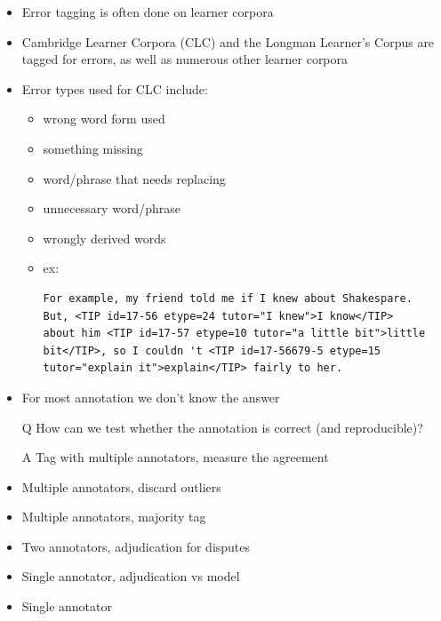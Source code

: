\documentclass[a4paper,landscape,headrule,footrule,dvips]{foils}
\begin{document}
\begin{CJK}{UTF8}{min}
\begin{itemize}
\item  Error tagging is often done on learner corpora
\item  Cambridge Learner Corpora (CLC) and the Longman Learner’s Corpus
are tagged for errors, as well as numerous other learner corpora
\item  Error types used for CLC include:
  \begin{itemize}
  \item  wrong word form used
  \item  something missing
  \item  word/phrase that needs replacing
  \item  unnecessary word/phrase
  \item  wrongly derived words
  \item  ex: 
    \begin{small}
\begin{verbatim}
For example, my friend told me if I knew about Shakespare. 
But, <TIP id=17-56 etype=24 tutor="I knew">I know</TIP> 
about him <TIP id=17-57 etype=10 tutor="a little bit">little 
bit</TIP>, so I couldn 't <TIP id=17-56679-5 etype=15 
tutor="explain it">explain</TIP> fairly to her.
\end{verbatim}
    \end{small}

  \end{itemize}
\end{itemize}



\begin{itemize}
\item For most annotation we don't know the answer
\item[Q] How can we test whether the annotation is correct (and reproducible)?
\item[A] Tag with multiple annotators, measure the agreement

\end{itemize}


\begin{itemize}
\item Multiple annotators, discard outliers
\item Multiple annotators, majority tag
\item Two annotators, adjudication for disputes
\item Single annotator, adjudication vs model
\item Single annotator
\end{itemize}


\end{CJK}
\end{document}

